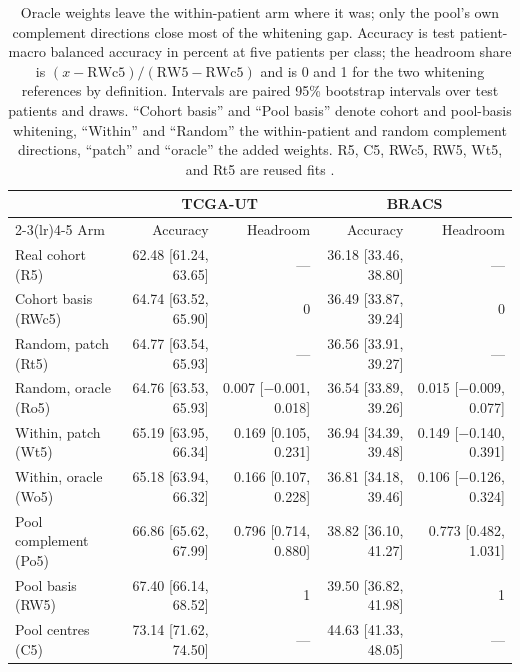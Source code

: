 \begin{table}[htbp]
\centering
\footnotesize
\setlength{\tabcolsep}{4pt}
\renewcommand{\arraystretch}{1.15}
\begin{tabular}{@{}lrrrr@{}}
\toprule
 & \multicolumn{2}{c}{TCGA-UT} & \multicolumn{2}{c}{BRACS} \\
\cmidrule(lr){2-3}\cmidrule(lr){4-5}
Arm & Accuracy & Headroom & Accuracy & Headroom \\
\midrule
Real cohort (R5) & 62.48 [61.24, 63.65] & --- & 36.18 [33.46, 38.80] & --- \\
Cohort basis (RWc5) & 64.74 [63.52, 65.90] & 0 & 36.49 [33.87, 39.24] & 0 \\
Random, patch (Rt5) & 64.77 [63.54, 65.93] & --- & 36.56 [33.91, 39.27] & --- \\
Random, oracle (Ro5) & 64.76 [63.53, 65.93] & 0.007 [$-$0.001, 0.018] & 36.54 [33.89, 39.26] & 0.015 [$-$0.009, 0.077] \\
Within, patch (Wt5) & 65.19 [63.95, 66.34] & 0.169 [0.105, 0.231] & 36.94 [34.39, 39.48] & 0.149 [$-$0.140, 0.391] \\
Within, oracle (Wo5) & 65.18 [63.94, 66.32] & 0.166 [0.107, 0.228] & 36.81 [34.18, 39.46] & 0.106 [$-$0.126, 0.324] \\
Pool complement (Po5) & 66.86 [65.62, 67.99] & 0.796 [0.714, 0.880] & 38.82 [36.10, 41.27] & 0.773 [0.482, 1.031] \\
Pool basis (RW5) & 67.40 [66.14, 68.52] & 1 & 39.50 [36.82, 41.98] & 1 \\
Pool centres (C5) & 73.14 [71.62, 74.50] & --- & 44.63 [41.33, 48.05] & --- \\
\bottomrule
\end{tabular}
\caption{Oracle weights leave the within-patient arm where it was; only the pool's own complement directions close most of the whitening gap. Accuracy is test patient-macro balanced accuracy in percent at five patients per class; the headroom share is $(x-\mathrm{RWc5})/(\mathrm{RW5}-\mathrm{RWc5})$ and is 0 and 1 for the two whitening references by definition. Intervals are paired 95\% bootstrap intervals over test patients and draws. ``Cohort basis'' and ``Pool basis'' denote cohort and pool-basis whitening, ``Within'' and ``Random'' the within-patient and random complement directions, ``patch'' and ``oracle'' the added weights. R5, C5, RWc5, RW5, Wt5, and Rt5 are reused fits \citep{queisler2026centreError,queisler2026patientDirections,queisler2026bracsMechanism,queisler2026withinPatientSpan}.}
\label{tab:ladder}
\end{table}

